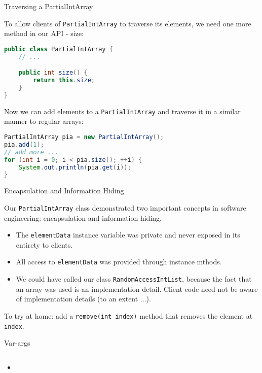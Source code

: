 \documentclass{beamer}
\begin{document}
\begin{frame}[fragile]{Traversing a PartialIntArray}


To allow clients of {\tt PartialIntArray} to traverse its elements, we need one more method in our API - size:
\begin{lstlisting}[language=Java]
public class PartialIntArray {
    // ...

    public int size() {
        return this.size;
    }
}
\end{lstlisting}
Now we can add elements to a {\tt PartialIntArray} and traverse it in a similar manner to regular arrays:

\begin{lstlisting}[language=Java]
PartialIntArray pia = new PartialIntArray();
pia.add(1);
// add more ...
for (int i = 0; i < pia.size(); ++i) {
    System.out.println(pia.get(i));
}
\end{lstlisting}

\end{frame}

\begin{frame}[fragile]{Encapsulation and Information Hiding}


Our {\tt PartialIntArray} class demonstrated two important concepts in software engineering: encapsulation and information hiding.

\begin{itemize}
\item The {\tt elementData} instance variable was private and never exposed in its entirety to clients.
\item All access to {\tt elementData} was provided through instance mthods.
\item We could have called our class {\tt RandomAccessIntList}, because the fact that an array was used is an implementation detail.  Client code need not be aware of implementation details (to an extent ...).
\end{itemize}

To try at home: add a {\tt remove(int index)} method that removes the element at {\tt index}.

\end{frame}

\begin{frame}[fragile]{Var-args}


\begin{lstlisting}[language=Java]

\end{lstlisting}

\begin{itemize}
\item
\end{itemize}


\end{frame}
\end{document}
